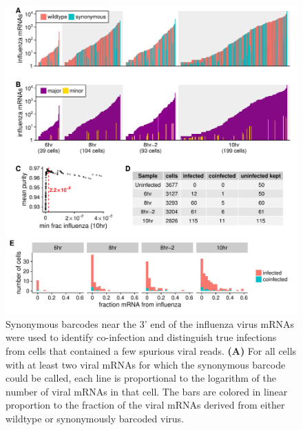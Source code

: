 \documentclass[9pt,lineno]{elife}
\begin{document}
\begin{figure}
\end{figure}

\begin{figure}
\includegraphics[width=\linewidth]{figures/p_frac_flu_summary.pdf}
\caption{
Synonymous barcodes near the 3' end of the influenza virus mRNAs were used to identify co-infection and distinguish true infections from cells that contained a few spurious viral reads.
{\bf (A)}
For all cells with at least two viral mRNAs for which the synonymous barcode could be called, each line is proportional to the logarithm of the number of viral mRNAs in that cell.
The bars are colored in linear proportion to the fraction of the viral mRNAs derived from either wildtype or synonymously barcoded virus.
}
\end{figure}
\end{document}
